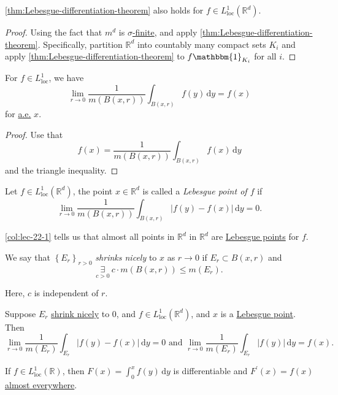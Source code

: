 \begin{corollary}\label{col:lec-22-1}
	\autoref{thm:Lebesgue-differentiation-theorem} also holds for \(f\in L^1_{\text{loc}}(\mathbb{R} ^d)\).
\end{corollary}
\begin{proof}
	Using the fact that \(m^d\) is \hyperref[def:finite-measure]{\(\sigma \)-finite}, and apply \autoref{thm:Lebesgue-differentiation-theorem}.
	Specifically, partition \(\mathbb{R} ^d\) into countably many compact sets \(K_{i} \) and apply \autoref{thm:Lebesgue-differentiation-theorem}
	to \(f\mathbbm{1}_{K_{i} } \) for all \(i\).
\end{proof}

\begin{corollary}\label{col:lec-22-2}
	For \(f\in L^1_{\text{loc} }\), we have
	\[
		\lim\limits_{r \to 0} \frac{1}{m(B(x, r))}\int_{B(x, r)}^{} f(y) \,\mathrm{d}y = f(x)
	\]
	for \hyperref[def:mu-almost-everywhere]{a.e.} \(x\).
\end{corollary}
\begin{proof}
	Use that
	\[
		f(x) = \frac{1}{m(B(x, r))}\int _{B(x, r)} f(x)\,\mathrm{d} y
	\]
	and the triangle inequality.
\end{proof}

\begin{definition}\label{def:Lebesgue-point}
	Let \(f\in L^1_{\text{loc}}(\mathbb{R} ^d)\), the point \(x\in \mathbb{R} ^d\) is called a \emph{Lebesgue point of \(f\)} if
	\[
		\lim\limits_{r \to 0} \frac{1}{m(B(x, r))}\int _{B(x, r)}\left\vert f(y) - f(x) \right\vert \,\mathrm{d} y = 0.
	\]
\end{definition}
\begin{remark}
	\autoref{col:lec-22-1} tells us that almost all points in \(\mathbb{R} ^d\) in \(\mathbb{R} ^d\) are \hyperref[def:Lebesgue-point]{Lebesgue points}  for \(f\).
\end{remark}

\begin{definition}\label{def:shrink-nicely}
	We say that \(\left\{E_{r} \right\}_{r>0}\) \emph{shrinks nicely} to \(x\) as \(r\to 0\) if \(E_{r} \subset B(x, r)\) and
	\[
		\underset{c>0}{\exists } \ c\cdot m(B(x, r)) \leq m(E_{r} ).
	\]
\end{definition}
\begin{note}
	Here, \(c\) is independent of \(r\).
\end{note}

\begin{corollary}
	Suppose \(E_r\) \hyperref[def:shrink-nicely]{shrink nicely} to \(0\), and \(f\in L^1_{\text{loc}}(\mathbb{R} ^d)\), and \(x\) is a \hyperref[def:Lebesgue-point]{Lebesgue point}.
	Then
	\[
		\lim\limits_{r \to 0} \frac{1}{m(E_{r} )} \int _{E_{r}}\left\vert f(y) - f(x) \right\vert \,\mathrm{d} y= 0\text{ and }
		\lim\limits_{r \to 0} \frac{1}{m(E_{r} )} \int _{E_{r}}\left\vert f(y) \right\vert \,\mathrm{d} y= f(x).
	\]
\end{corollary}

\begin{corollary}
	If \(f\in L^1_{\text{loc} }(\mathbb{R} ) \), then \(F(x)= \int_{0}^x f(y)\,\mathrm{d} y\) is differentiable and \(F^\prime (x)=f(x)\) \hyperref[def:mu-almost-everywhere]{almost everywhere}.
\end{corollary}
